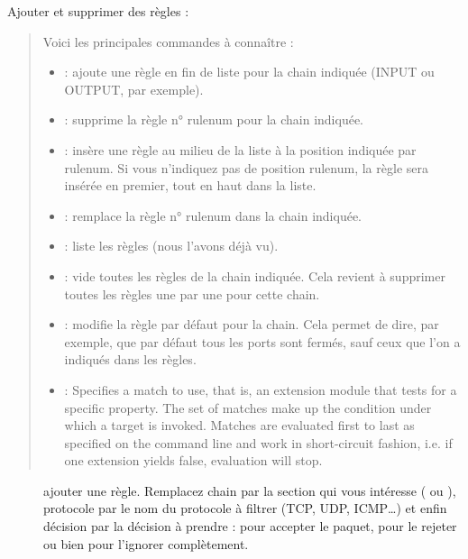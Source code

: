 \documentclass[letterpaper,10pt,french]{sphinxmanual}
\begin{document}
Ajouter et supprimer des règles :
\begin{quote}

Voici les principales commandes à connaître :
\begin{itemize}
\item {} 
 : ajoute une règle en fin de liste pour la chain indiquée (INPUT ou OUTPUT, par exemple).

\item {} 
 : supprime la règle n° rulenum pour la chain indiquée.

\item {} 
 : insère une règle au milieu de la liste à la position indiquée par rulenum. Si vous n’indiquez pas de position rulenum, la règle sera insérée en premier, tout en haut dans la liste.

\item {} 
 : remplace la règle n° rulenum dans la chain indiquée.

\item {} 
 : liste les règles (nous l’avons déjà vu).

\item {} 
 : vide toutes les règles de la chain indiquée. Cela revient à supprimer toutes les règles une par une pour cette chain.

\item {} 
 : modifie la règle par défaut pour la chain. Cela permet de dire, par exemple, que par défaut tous les ports sont fermés, sauf ceux que l’on a indiqués dans les règles.

\item {} 
 : Specifies  a  match  to use, that is, an extension module that tests for a specific property. The set of matches make up the condition under which a target is invoked. Matches are evaluated first to last as specified on the command line and work in short-circuit fashion,  i.e.  if one extension yields false, evaluation will stop.

\end{itemize}
\end{quote}
\begin{description}
\item[{}] \leavevmode
ajouter une règle. Remplacez chain par la section qui vous intéresse ( ou ), protocole par le nom du protocole à filtrer (TCP, UDP, ICMP…) et enfin décision par la décision à prendre :  pour accepter le paquet,  pour le rejeter ou bien  pour l’ignorer complètement.

\end{description}
\end{document}
